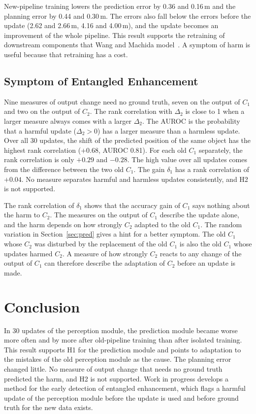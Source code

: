 \documentclass[conference]{IEEEtran}
\begin{document}
New-pipeline training lowers the prediction error by 0.36 and 0.16\,m and the planning error by 0.44 and 0.30\,m. The errors also fall below the errors before the update (2.62 and 2.66\,m, 4.16 and 4.00\,m), and the update becomes an improvement of the whole pipeline. This result supports the retraining of downstream components that Wang and Machida model~\cite{wang2024compsac,wang2025issre}. A symptom of harm is useful because that retraining has a cost.

\subsection{Symptom of Entangled Enhancement}
Nine measures of output change need no ground truth, seven on the output of $C_1$ and two on the output of $C_2$. The rank correlation with $\Delta_2$ is close to 1 when a larger measure always comes with a larger $\Delta_2$. The AUROC is the probability
that a harmful update ($\Delta_2 > 0$) has a larger measure than a harmless
update. Over all 30 updates, the shift of the predicted position of the same
object has the highest rank correlation ($+0.68$, AUROC 0.81). For each old
$C_1$ separately, the rank correlation is only $+0.29$ and $-0.28$. The high
value over all updates comes from the difference between the two old $C_1$.
The gain $\delta_1$ has a rank correlation of $+0.04$. No measure separates harmful and harmless updates consistently, and H2 is not supported.

The rank correlation of $\delta_1$ shows that the accuracy gain of $C_1$ says nothing about the harm to $C_2$. The measures on the output of $C_1$ describe the update alone, and the harm depends on how strongly $C_2$ adapted to the old $C_1$. The random variation in Section~\ref{sec:pred} gives a hint for a better symptom. The old $C_1$ whose $C_2$ was disturbed by the replacement of the old $C_1$ is also the old $C_1$ whose updates harmed $C_2$. A measure of how strongly $C_2$ reacts to any change of the output of $C_1$ can therefore describe the adaptation of $C_2$ before an update is made.

\section{Conclusion}

In 30 updates of the perception module, the prediction module became worse more often and by more after old-pipeline training than after isolated training. This result
supports H1 for the prediction module and points to adaptation to the mistakes
of the old perception module as the cause. The planning error changed little.
No measure of output change that needs no ground truth predicted the harm, and H2 is not supported. Work in progress develops a method for the early detection
of entangled enhancement, which flags a harmful update of the perception module
before the update is used and before ground truth for the new data exists.



\end{document}
